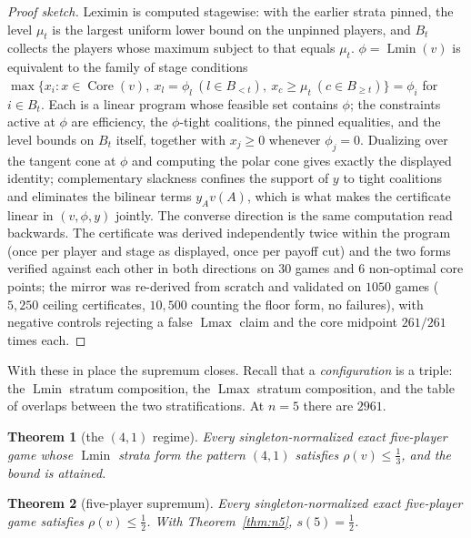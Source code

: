 \documentclass[11pt]{article}
\newtheorem{theorem}{Theorem}
\newcommand{\core}{\operatorname{Core}}
\newcommand{\Lmin}{\operatorname{Lmin}}
\newcommand{\Lmax}{\operatorname{Lmax}}
\begin{document}
\begin{proof}[Proof sketch]
Leximin is computed stagewise: with the earlier strata pinned, the level
$\mu_t$ is the largest uniform lower bound on the unpinned players, and
$B_t$ collects the players whose maximum subject to that equals $\mu_t$.
$\phi=\Lmin(v)$ is equivalent to the family of stage conditions
$\max\{x_i:x\in\core(v),\ x_l=\phi_l\ (l\in B_{<t}),\ x_c\ge\mu_t\
(c\in B_{\ge t})\}=\phi_i$ for $i\in B_t$.  Each is a linear program whose
feasible set contains $\phi$; the constraints active at $\phi$ are
efficiency, the $\phi$-tight coalitions, the pinned equalities, and the
level bounds on $B_t$ itself, together with $x_j\ge0$ whenever
$\phi_j=0$.  Dualizing over the tangent cone at $\phi$
and computing the polar cone gives exactly the displayed identity;
complementary slackness confines the support of $y$ to tight coalitions
and eliminates the bilinear terms $y_Av(A)$, which is what makes the
certificate linear in $(v,\phi,y)$ jointly.  The converse direction is the
same computation read backwards.  The certificate was derived independently
twice within the program (once per player and stage as displayed, once per
payoff cut) and the two forms verified against each other in both
directions on $30$ games and $6$ non-optimal core points; the mirror was
re-derived from scratch and validated on $1050$ games ($5{,}250$ ceiling
certificates, $10{,}500$ counting the floor form, no failures), with
negative controls rejecting a false
$\Lmax$ claim and the core midpoint $261/261$ times each.
\end{proof}

With these in place the supremum closes.  Recall that a \emph{configuration}
is a triple: the $\Lmin$ stratum composition, the $\Lmax$ stratum
composition, and the table of overlaps between the two stratifications.
At $n=5$ there are $2961$.

\begin{theorem}[the $(4,1)$ regime]\label{thm:regime41}
Every singleton-normalized exact five-player game whose $\Lmin$ strata form
the pattern $(4,1)$ satisfies $\rho(v)\le\tfrac13$, and the bound is
attained.
\end{theorem}

\begin{theorem}[five-player supremum]\label{thm:s5}
Every singleton-normalized exact five-player game satisfies
$\rho(v)\le\tfrac12$.  With Theorem~\ref{thm:n5}, $s(5)=\tfrac12$.
\end{theorem}
\end{document}

